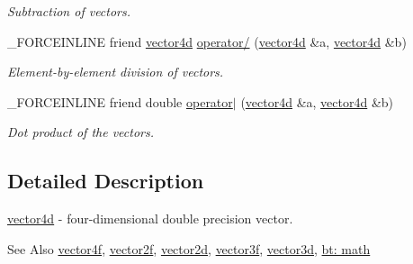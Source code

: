 \begin{DoxyCompactItemize}
\begin{DoxyCompactList}\small\item\em Subtraction of vectors. \end{DoxyCompactList}\item 
\hypertarget{classbt_1_1vector4d_ae37235989694f97c4b027efbf2507a13}{\-\_\-\-F\-O\-R\-C\-E\-I\-N\-L\-I\-N\-E friend \hyperlink{classbt_1_1vector4d}{vector4d} \hyperlink{classbt_1_1vector4d_ae37235989694f97c4b027efbf2507a13}{operator/} (\hyperlink{classbt_1_1vector4d}{vector4d} \&a, \hyperlink{classbt_1_1vector4d}{vector4d} \&b)}\label{classbt_1_1vector4d_ae37235989694f97c4b027efbf2507a13}

\begin{DoxyCompactList}\small\item\em Element-\/by-\/element division of vectors. \end{DoxyCompactList}\item 
\hypertarget{classbt_1_1vector4d_afaf5b718f86430797572cd96b485cbbd}{\-\_\-\-F\-O\-R\-C\-E\-I\-N\-L\-I\-N\-E friend double \hyperlink{classbt_1_1vector4d_afaf5b718f86430797572cd96b485cbbd}{operator$|$} (\hyperlink{classbt_1_1vector4d}{vector4d} \&a, \hyperlink{classbt_1_1vector4d}{vector4d} \&b)}\label{classbt_1_1vector4d_afaf5b718f86430797572cd96b485cbbd}

\begin{DoxyCompactList}\small\item\em Dot product of the vectors. \end{DoxyCompactList}\end{DoxyCompactItemize}


\subsection{Detailed Description}
\hyperlink{classbt_1_1vector4d}{vector4d} -\/ four-\/dimensional double precision vector. 

\begin{DoxySeeAlso}{See Also}
\hyperlink{classbt_1_1vector4f}{vector4f}, \hyperlink{classbt_1_1vector2f}{vector2f}, \hyperlink{classbt_1_1vector2d}{vector2d}, \hyperlink{classbt_1_1vector3f}{vector3f}, \hyperlink{classbt_1_1vector3d}{vector3d}, \hyperlink{group__math}{bt\-: math} 
\end{DoxySeeAlso}


